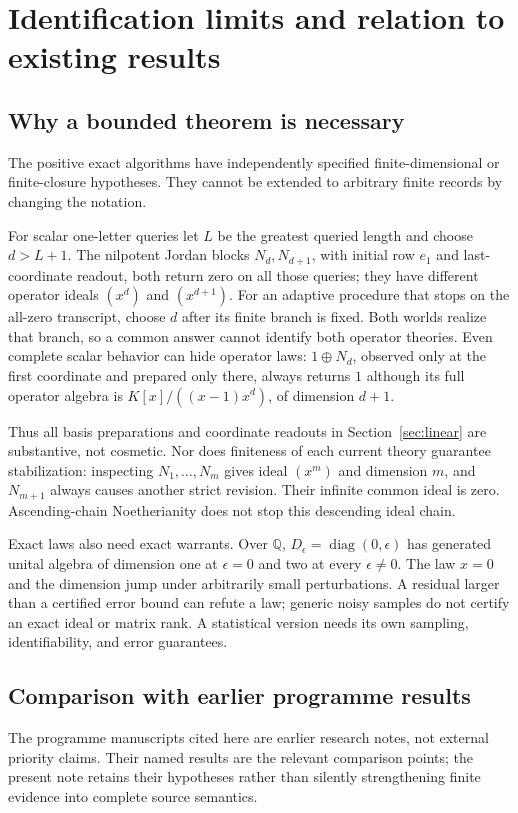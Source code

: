 \documentclass[11pt]{article}
\theoremstyle{definition}
\theoremstyle{remark}\newtheorem{remark}[theorem]{Remark}
\begin{document}
\section{Identification limits and relation to existing results}
\subsection{Why a bounded theorem is necessary}
The positive exact algorithms have independently specified finite-dimensional
or finite-closure hypotheses. They cannot be extended to arbitrary finite
records by changing the notation.

For scalar one-letter queries let $L$ be the greatest queried length and
choose $d>L+1$. The nilpotent Jordan blocks $N_d,N_{d+1}$, with initial row
$e_1$ and last-coordinate readout, both return zero on all those queries;
they have different operator ideals $(x^d)$ and $(x^{d+1})$. For an adaptive
procedure that stops on the all-zero transcript, choose $d$ after its
finite branch is fixed. Both worlds realize that branch, so a common answer
cannot identify both operator theories. Even complete scalar behavior can
hide operator laws: $1\oplus N_d$, observed only at the first coordinate
and prepared only there, always returns $1$ although its full operator
algebra is $K[x]/((x-1)x^d)$, of dimension $d+1$.

Thus all basis preparations and coordinate readouts in
Section~\ref{sec:linear} are substantive, not cosmetic. Nor does finiteness
of each current theory guarantee stabilization: inspecting
$N_1,\ldots,N_m$ gives ideal $(x^m)$ and dimension $m$, and $N_{m+1}$
always causes another strict revision. Their infinite common ideal is zero.
Ascending-chain Noetherianity does not stop this descending ideal chain.

Exact laws also need exact warrants. Over $\mathbb Q$,
$D_\epsilon=\operatorname{diag}(0,\epsilon)$ has generated unital algebra
of dimension one at $\epsilon=0$ and two at every $\epsilon\ne0$.
The law $x=0$ and the dimension jump under arbitrarily small perturbations.
A residual larger than a certified error bound can refute a law; generic
noisy samples do not certify an exact ideal or matrix rank. A statistical
version needs its own sampling, identifiability, and error guarantees.

\subsection{Comparison with earlier programme results}
\label{sec:prior-programme}
The programme manuscripts cited here are earlier research notes, not
external priority claims. Their named results are the relevant comparison
points; the present note retains their hypotheses rather than silently
strengthening finite evidence into complete source semantics.
\end{document}
